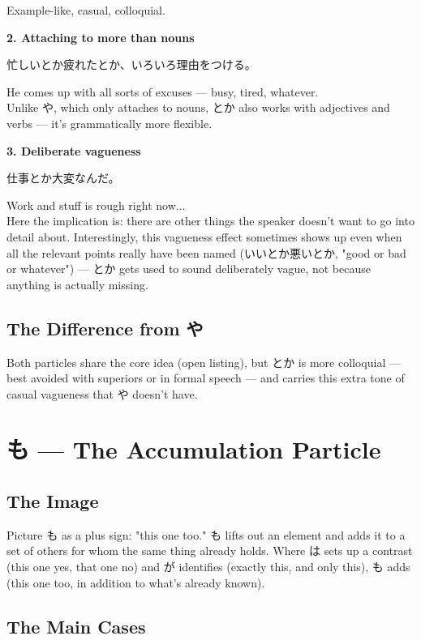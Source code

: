 \documentclass[12pt]{book}
\begin{document}
Example-like, casual, colloquial.

\textbf{2. Attaching to more than nouns}
\par\quad 忙しいとか疲れたとか、いろいろ理由をつける。\\
\par\quad He comes up with all sorts of excuses — busy, tired, whatever.\\

Unlike や, which only attaches to nouns, とか also works with adjectives and verbs — it's grammatically more flexible.

\textbf{3. Deliberate vagueness}
\par\quad 仕事とか大変なんだ。\\
\par\quad Work and stuff is rough right now...\\

Here the implication is: there are other things the speaker doesn't want to go into detail about. Interestingly, this vagueness effect sometimes shows up even when all the relevant points really have been named (いいとか悪いとか, "good or bad or whatever") — とか gets used to sound deliberately vague, not because anything is actually missing.

\section*{The Difference from や}

Both particles share the core idea (open listing), but とか is more colloquial — best avoided with superiors or in formal speech — and carries this extra tone of casual vagueness that や doesn't have.


\chapter{も — The Accumulation Particle}

\section*{The Image}

Picture も as a plus sign: "this one too." も lifts out an element and adds it to a set of others for whom the same thing already holds. Where は sets up a contrast (this one yes, that one no) and が identifies (exactly this, and only this), も adds (this one too, in addition to what's already known).

\section*{The Main Cases}
\end{document}

